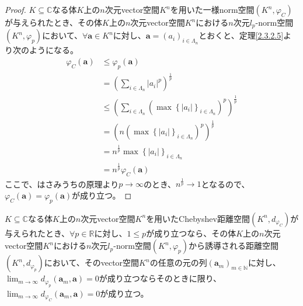 \documentclass[dvipdfmx]{jsarticle}
\begin{document}
\begin{proof}
$K \subseteq \mathbb{C}$なる体$K$上の$n$次元vector空間$K^{n}$を用いた一様norm空間$\left( K^{n},\varphi_{C} \right)$が与えられたとき、その体$K$上の$n$次元vector空間$K^{n}$における$n$次元$l_{p}$-norm空間$\left( K^{n},\varphi_{p} \right)$において、$\forall\mathbf{a} \in K^{n}$に対し、$\mathbf{a} = \left( a_{i} \right)_{i \in \varLambda_{n}}$とおくと、定理\ref{2.3.2.5}より次のようになる。
\begin{align*}
\varphi_{C}\left( \mathbf{a} \right) &\leq \varphi_{p}\left( \mathbf{a} \right)\\
&= \left( \sum_{i \in \varLambda_{n}} \left| a_{i} \right|^{p} \right)^{\frac{1}{p}}\\
&\leq \left( \sum_{i \in \varLambda_{n}} \left( \max\left\{ \left| a_{i} \right| \right\}_{i \in \varLambda_{n}} \right)^{p} \right)^{\frac{1}{p}}\\
&= \left( {n\left( \max\left\{ \left| a_{i} \right| \right\}_{i \in \varLambda_{n}} \right)}^{p} \right)^{\frac{1}{p}}\\
&= n^{\frac{1}{p}}\max\left\{ \left| a_{i} \right| \right\}_{i \in \varLambda_{n}}\\
&= n^{\frac{1}{p}}\varphi_{C}\left( \mathbf{a} \right)
\end{align*}
ここで、はさみうちの原理より$p \rightarrow \infty$のとき、$n^{\frac{1}{p}} \rightarrow 1$となるので、$\varphi_{C}\left( \mathbf{a} \right) = \varphi_{p}\left( \mathbf{a} \right)$が成り立つ。
\end{proof}
\begin{thm}\label{2.3.2.7}
$K \subseteq \mathbb{C}$なる体$K$上の$n$次元vector空間$K^{n}$を用いたChebyshev距離空間$\left( K^{n},d_{\varphi_{C}} \right)$が与えられたとき、$\forall p \in \mathbb{R}$に対し、$1 \leq p$が成り立つなら、その体$K$上の$n$次元vector空間$K^{n}$における$n$次元$l_{p}$-norm空間$\left( K^{n},\varphi_{p} \right)$から誘導される距離空間$\left( K^{n},d_{\varphi_{p}} \right)$において、そのvector空間$K^{n}$の任意の元の列$\left( \mathbf{a}_{m} \right)_{m \in \mathbb{N}}$に対し、$\lim_{m \rightarrow \infty}{d_{\varphi_{p}}\left( \mathbf{a}_{m},\mathbf{a} \right)} = 0$が成り立つならそのときに限り、$\lim_{m \rightarrow \infty}{d_{\varphi_{C}}\left( \mathbf{a}_{m},\mathbf{a} \right)} = 0$が成り立つ。
\end{thm}
\end{document}
